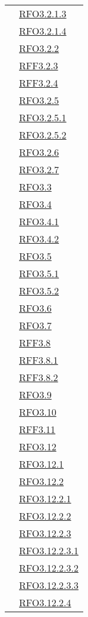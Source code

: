 \begin{longtable}{|>{\centering}m{5cm}|m{5cm}<{\centering}|}
& \hyperlink{RFO3.2.1.3}{RFO3.2.1.3}\\
& \hyperlink{RFO3.2.1.4}{RFO3.2.1.4}\\
& \hyperlink{RFO3.2.2}{RFO3.2.2}\\
& \hyperlink{RFF3.2.3}{RFF3.2.3}\\
& \hyperlink{RFF3.2.4}{RFF3.2.4}\\
& \hyperlink{RFO3.2.5}{RFO3.2.5}\\
& \hyperlink{RFO3.2.5.1}{RFO3.2.5.1}\\
& \hyperlink{RFO3.2.5.2}{RFO3.2.5.2}\\
& \hyperlink{RFO3.2.6}{RFO3.2.6}\\
& \hyperlink{RFO3.2.7}{RFO3.2.7}\\
& \hyperlink{RFO3.3}{RFO3.3}\\
& \hyperlink{RFO3.4}{RFO3.4}\\
& \hyperlink{RFO3.4.1}{RFO3.4.1}\\
& \hyperlink{RFO3.4.2}{RFO3.4.2}\\
& \hyperlink{RFO3.5}{RFO3.5}\\
& \hyperlink{RFO3.5.1}{RFO3.5.1}\\
& \hyperlink{RFO3.5.2}{RFO3.5.2}\\
& \hyperlink{RFO3.6}{RFO3.6}\\
& \hyperlink{RFO3.7}{RFO3.7}\\
& \hyperlink{RFF3.8}{RFF3.8}\\
& \hyperlink{RFF3.8.1}{RFF3.8.1}\\
& \hyperlink{RFF3.8.2}{RFF3.8.2}\\
& \hyperlink{RFO3.9}{RFO3.9}\\
& \hyperlink{RFO3.10}{RFO3.10}\\
& \hyperlink{RFF3.11}{RFF3.11}\\
& \hyperlink{RFO3.12}{RFO3.12}\\
& \hyperlink{RFO3.12.1}{RFO3.12.1}\\
& \hyperlink{RFO3.12.2}{RFO3.12.2}\\
& \hyperlink{RFO3.12.2.1}{RFO3.12.2.1}\\
& \hyperlink{RFO3.12.2.2}{RFO3.12.2.2}\\
& \hyperlink{RFO3.12.2.3}{RFO3.12.2.3}\\
& \hyperlink{RFO3.12.2.3.1}{RFO3.12.2.3.1}\\
& \hyperlink{RFO3.12.2.3.2}{RFO3.12.2.3.2}\\
& \hyperlink{RFO3.12.2.3.3}{RFO3.12.2.3.3}\\
& \hyperlink{RFO3.12.2.4}{RFO3.12.2.4}\\

\end{longtable}

